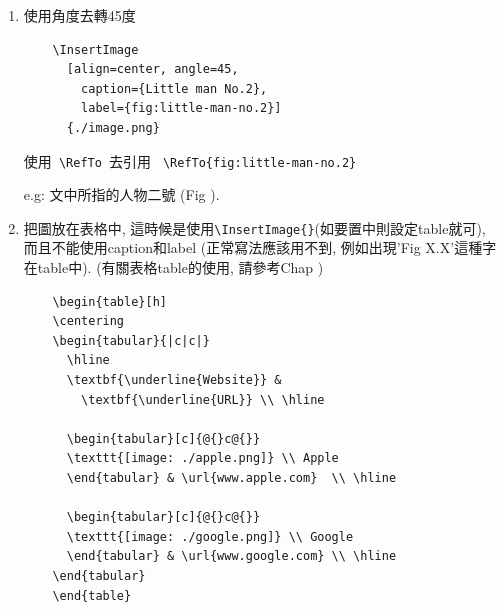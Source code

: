 \begin{enumerate}
{    之後可以使用\verb| \RefTo |去引用 \verb| \RefTo{fig:little-man-no.1} |

    e.g: 文中所指的人物一號 (Fig ).
  } %

  \item
  {
    使用角度去轉45度
    \begin{verbatim}
    \InsertImage
      [align=center, angle=45,
        caption={Little man No.2},
        label={fig:little-man-no.2}]
      {./image.png}
    \end{verbatim}

    使用\verb| \RefTo |去引用 \verb| \RefTo{fig:little-man-no.2} |

    e.g: 文中所指的人物二號 (Fig ).
  } %

  \newpage
  \item
  {
    把圖放在表格中, 這時候是使用\verb|\InsertImage{}|(如要置中則設定table就可), 而且不能使用caption和label (正常寫法應該用不到, 例如出現'Fig X.X'這種字在table中). (有關表格table的使用, 請參考Chap )

    \begin{verbatim}
    \begin{table}[h]
    \centering
    \begin{tabular}{|c|c|}
      \hline
      \textbf{\underline{Website}} &
        \textbf{\underline{URL}} \\ \hline

      \begin{tabular}[c]{@{}c@{}}
      \texttt{[image: ./apple.png]} \\ Apple
      \end{tabular} & \url{www.apple.com}  \\ \hline

      \begin{tabular}[c]{@{}c@{}}
      \texttt{[image: ./google.png]} \\ Google
      \end{tabular} & \url{www.google.com} \\ \hline
    \end{tabular}
    \end{table}
    \end{verbatim}

}
\end{enumerate}
